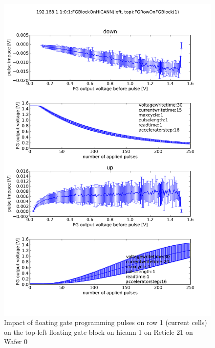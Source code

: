 \documentclass[a4paper,twocolumn,draft=true]{scrartcl}
\begin{document}
\begin{figure}
\includegraphics[scale=.35]{figures/pulse_characterization_current_15_20.png}
\caption{Impact of floating gate programming pulses on row 1 (current cells) on the top-left floating gate block on hicann 1 on Reticle 21 on Wafer 0}
\label{fig:pulse_characterization_current_15_20}
\end{figure}
\end{document}
